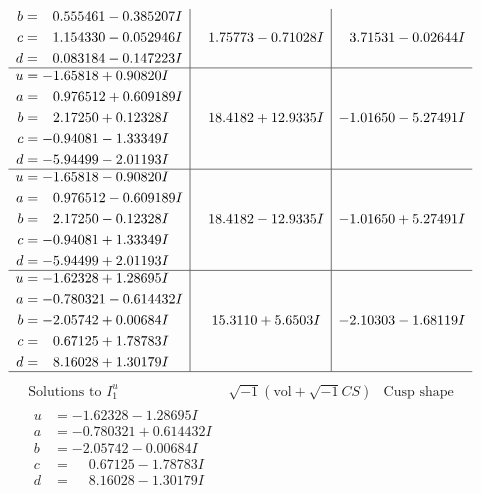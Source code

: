 \documentclass[1p]{elsarticle_modified}
\theoremstyle{definition}
\newcommand{\I}{\sqrt{-1}}
\begin{document}
$$\begin{array}{c|c|c}
\begin{aligned}
b &= \phantom{-}0.555461 - 0.385207 I \\
c &= \phantom{-}1.154330 - 0.052946 I \\
d &= \phantom{-}0.083184 - 0.147223 I\end{aligned}
 & \phantom{-}1.75773 - 0.71028 I & \phantom{-}3.71531 - 0.02644 I \\ \hline\begin{aligned}
u &= -1.65818 + 0.90820 I \\
a &= \phantom{-}0.976512 + 0.609189 I \\
b &= \phantom{-}2.17250 + 0.12328 I \\
c &= -0.94081 - 1.33349 I \\
d &= -5.94499 - 2.01193 I\end{aligned}
 & \phantom{-}18.4182 + 12.9335 I & -1.01650 - 5.27491 I \\ \hline\begin{aligned}
u &= -1.65818 - 0.90820 I \\
a &= \phantom{-}0.976512 - 0.609189 I \\
b &= \phantom{-}2.17250 - 0.12328 I \\
c &= -0.94081 + 1.33349 I \\
d &= -5.94499 + 2.01193 I\end{aligned}
 & \phantom{-}18.4182 - 12.9335 I & -1.01650 + 5.27491 I \\ \hline\begin{aligned}
u &= -1.62328 + 1.28695 I \\
a &= -0.780321 - 0.614432 I \\
b &= -2.05742 + 0.00684 I \\
c &= \phantom{-}0.67125 + 1.78783 I \\
d &= \phantom{-}8.16028 + 1.30179 I\end{aligned}
 & \phantom{-}15.3110 + 5.6503 I & -2.10303 - 1.68119 I\\
 \hline 
 \end{array}$$\newpage$$\begin{array}{c|c|c}  
\text{Solutions to }I^u_{1}& \I (\text{vol} + \sqrt{-1}CS) & \text{Cusp shape}\\
 \hline 
\begin{aligned}
u &= -1.62328 - 1.28695 I \\
a &= -0.780321 + 0.614432 I \\
b &= -2.05742 - 0.00684 I \\
c &= \phantom{-}0.67125 - 1.78783 I \\
d &= \phantom{-}8.16028 - 1.30179 I\end{aligned}

\end{array}$$
\end{document}
